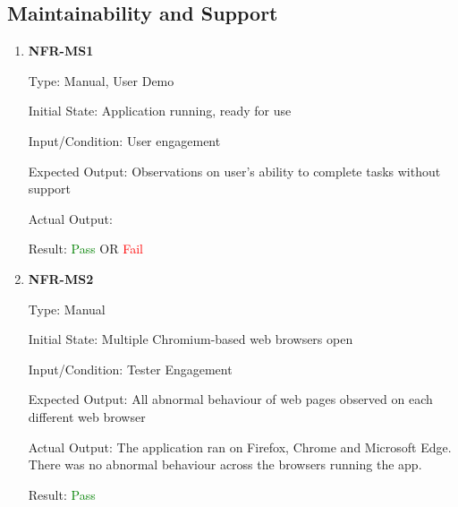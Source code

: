 \documentclass[12pt, titlepage]{article}
\begin{document}
\subsection{Maintainability and Support}
\begin{enumerate}
\item{\textbf{NFR-MS1}} \label{NFR:MS1}

Type: Manual, User Demo

Initial State: Application running, ready for use

Input/Condition: User engagement

Expected Output: Observations on user's ability to complete tasks without
support

Actual Output:

Result: \textcolor{green}{Pass} OR \textcolor{red}{Fail}
					
\item{\textbf{NFR-MS2}} \label{NFR:MS2}

Type: Manual

Initial State: Multiple Chromium-based web browsers open

Input/Condition: Tester Engagement

Expected Output: All abnormal behaviour of web pages observed on each different
web browser

Actual Output: The application ran on Firefox, Chrome and Microsoft Edge. There
was no abnormal behaviour across the browsers running the app. 

Result: \textcolor{green}{Pass}
\end{enumerate}
\end{document}
